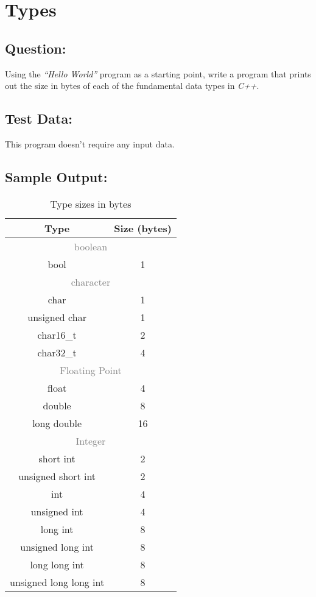 \documentclass[main.tex]{subfiles}
\begin{document}
    \section{Types}
        \subsection{Question:}
            Using the \textit{“Hello World”} program as a starting point, 
            write a program that prints out the size in bytes of each of the fundamental data types in \textit{C++}.

        \subsection{Test Data:}
            This program doesn't require any input data.
        
        \subsection{Sample Output:}
            \begin{table}[H]
                \centering
                \begin{tabular}{c c}
                    \hline
                    \textbf{Type} & \textbf{Size (bytes)} \\
                    \hline
                    \multicolumn{2}{c}{\textcolor{gray}{boolean}} \\
                    bool & 1 \\
                    \multicolumn{2}{c}{\textcolor{gray}{character}} \\
                    char & 1 \\
                    unsigned char & 1 \\
                    char16\_t & 2 \\
                    char32\_t & 4 \\
                    \multicolumn{2}{c}{\textcolor{gray}{Floating Point}} \\
                    float & 4 \\
                    double & 8 \\
                    long double & 16 \\
                    \multicolumn{2}{c}{\textcolor{gray}{Integer}} \\
                    short int & 2 \\
                    unsigned short int & 2 \\
                    int & 4 \\
                    unsigned int & 4 \\
                    long int & 8 \\
                    unsigned long int & 8 \\
                    long long int & 8 \\
                    unsigned long long int & 8 \\
                    \hline
                \end{tabular}
                \caption{Type sizes in bytes}
            \end{table}
\end{document}
